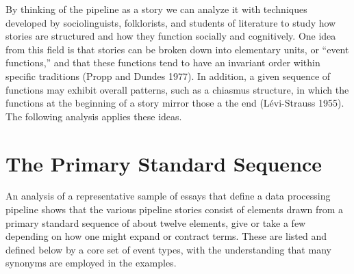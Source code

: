 \documentclass[
  letterpaper,
]{report}
\begin{document}
By thinking of the pipeline as a story we can analyze it with techniques
developed by sociolinguists, folklorists, and students of literature to
study how stories are structured and how they function socially and
cognitively. One idea from this field is that stories can be broken down
into elementary units, or ``event functions,'' and that these functions
tend to have an invariant order within specific traditions (Propp and
Dundes 1977). In addition, a given sequence of functions may exhibit
overall patterns, such as a chiasmus structure, in which the functions
at the beginning of a story mirror those a the end (Lévi-Strauss 1955).
The following analysis applies these ideas.

\hypertarget{the-primary-standard-sequence}{%
\chapter{The Primary Standard
Sequence}\label{the-primary-standard-sequence}}

An analysis of a representative sample of essays that define a data
processing pipeline shows that the various pipeline stories consist of
elements drawn from a primary standard sequence of about twelve
elements, give or take a few depending on how one might expand or
contract terms. These are listed and defined below by a core set of
event types, with the understanding that many synonyms are employed in
the examples.
\end{document}
